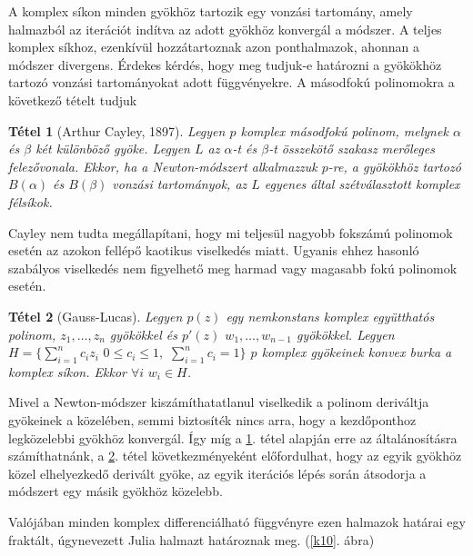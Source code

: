 \documentclass[a4paper,12pt]{report}
\newtheorem{Tet}{Tétel}[section]
\begin{document}
			A komplex síkon minden gyökhöz tartozik egy vonzási tartomány, amely halmazból az iterációt indítva az adott gyökhöz konvergál a módszer. A teljes komplex síkhoz, ezenkívül hozzátartoznak azon ponthalmazok, ahonnan a módszer divergens. Érdekes kérdés, hogy meg tudjuk-e határozni a gyökökhöz tartozó vonzási tartományokat adott függvényekre. A másodfokú polinomokra a következő tételt tudjuk
			\begin{Tet}[Arthur Cayley, 1897] \label{Cayley}
				Legyen $p$ komplex másodfokú polinom, melynek $\alpha$ és $\beta$ két különböző gyöke. Legyen $L$ az $\alpha$-t és $\beta$-t összekötő szakasz merőleges felezővonala. Ekkor, ha a Newton-módszert alkalmazzuk $p$-re, a gyökökhöz tartozó $B(\alpha)$ és $B(\beta)$ vonzási tartományok, az $L$ egyenes által szétválasztott komplex félsíkok.
			\end{Tet}
			Cayley nem tudta megállapítani, hogy mi teljesül nagyobb fokszámú polinomok esetén az azokon fellépő kaotikus viselkedés miatt. Ugyanis ehhez hasonló szabályos viselkedés nem figyelhető meg harmad vagy magasabb fokú polinomok esetén.


			\begin{Tet}[Gauss-Lucas]\label{GL}
				Legyen $p(z)$ egy nemkonstans komplex együtthatós polinom, $z_1,\ldots,z_n$ gyökökkel és $p'(z)$ $w_1,\ldots,w_{n-1}$ gyökökkel. Legyen $H=\{\sum_{i=1}^n c_iz_i\,\,0\leq c_i\leq 1,\,\,\sum_{i=1}^n c_i=1\}$ $p$ komplex gyökeinek konvex burka a komplex síkon. Ekkor $\forall i\,\,w_i\in H$.
			\end{Tet}
Mivel a Newton-módszer kiszámíthatatlanul viselkedik a polinom deriváltja gyökeinek a közelében, semmi biztosíték nincs arra, hogy a kezdőponthoz legközelebbi gyökhöz konvergál. Így míg a \ref{Cayley}. tétel alapján erre az általánosításra számíthatnánk, a \ref{GL}. tétel következményeként előfordulhat, hogy az egyik gyökhöz közel elhelyezkedő derivált gyöke, az egyik iterációs lépés során átsodorja a módszert egy másik gyökhöz közelebb.


			Valójában minden komplex differenciálható függvényre ezen halmazok határai egy fraktált, úgynevezett Julia halmazt határoznak meg. (\ref{k10}. ábra)
\end{document}
